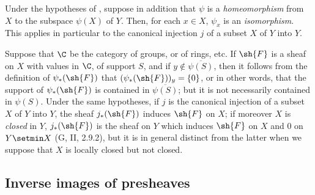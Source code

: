 \begin{env}[3.4.5]
\label{0.3.4.5}
Under the hypotheses of , suppose in addition that $\psi$ is a \emph{homeomorphism} from $X$ to the subspace $\psi(X)$ of $Y$.
Then, for each $x\in X$, $\psi_x$ is an \emph{isomorphism}.
This applies in particular to the canonical injection $j$ of a subset $X$ of $Y$ into $Y$.
\end{env}

\begin{env}[3.4.6]
\label{0.3.4.6}
Suppose that $\C$ be the category of groups, or of rings, etc. If $\sh{F}$ is a
sheaf on $X$ with values in $\C$, of support $S$, and if
$y\not\in\overline{\psi(S)}$, then it follows from the definition of
$\psi_*(\sh{F})$ that $(\psi_*(\sh{F}))_y=\{0\}$, or in other words, that the
support of $\psi_*(\sh{F})$ is contained in $\overline{\psi(S)}$; but it is not
necessarily contained in $\psi(S)$. Under the same hypotheses, if $j$ is the
canonical injection of a subset $X$ of $Y$ into $Y$, the sheaf $j_*(\sh{F})$
induces $\sh{F}$ on $X$; if moreover $X$ is \emph{closed} in $Y$, $j_*(\sh{F})$
is the sheaf on $Y$ which induces $\sh{F}$ on $X$ and $0$ on $Y\setmin X$
(G, II, 2.9.2), but it is in general distinct from the latter when we suppose
that $X$ is locally closed but not closed.
\end{env}

\subsection{Inverse images of presheaves}
\label{subsection:inverse-images-of-presheaves}

